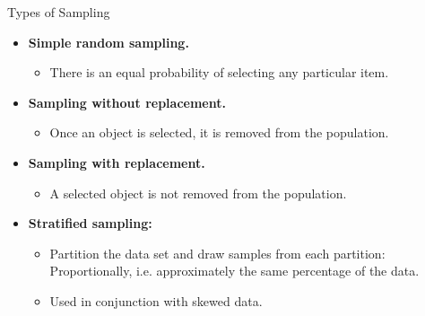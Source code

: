 \begin{frame}{Types of Sampling}
	\begin{itemize}
		\item \textbf{Simple random sampling.}
		      \begin{itemize}
			      \item There is an equal probability of selecting any particular
			            item.
		      \end{itemize}
		\item \textbf{Sampling without replacement.}
		      \begin{itemize}
			      \item Once an object is selected, it is removed from the population.
		      \end{itemize}
		\item \textbf{Sampling with replacement.}
		      \begin{itemize}
			      \item A selected object is not removed from the population.
		      \end{itemize}
		\item \textbf{Stratified sampling:}
		      \begin{itemize}
			      \item Partition the data set and draw samples from each partition:
			            Proportionally, i.e. approximately the same percentage of the data.
			      \item Used in conjunction with skewed data.
		      \end{itemize}
	\end{itemize}
\end{frame}

